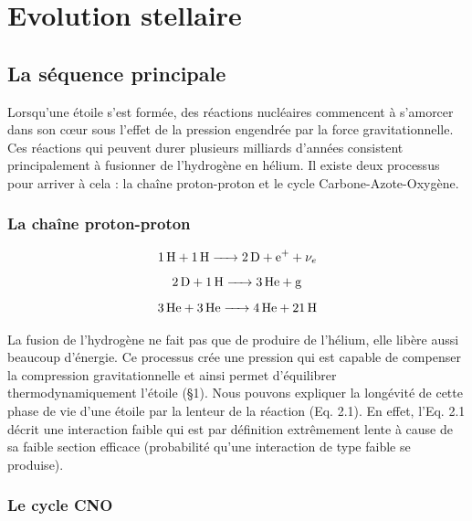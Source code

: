 

	
\chapter{Evolution stellaire}

\section{La séquence principale}

Lorsqu’une étoile s’est formée, des réactions nucléaires commencent à s’amorcer dans son cœur sous l’effet de la pression engendrée par la force gravitationnelle. Ces réactions qui peuvent durer plusieurs milliards d’années consistent principalement à fusionner de l’hydrogène en hélium. Il existe deux processus pour arriver à cela : la chaîne proton-proton et le cycle Carbone-Azote-Oxygène.

\subsection{La chaîne proton-proton}


\begin{equation}\ce{\ce{1H} + \ce{1H} -> \ce{2D} + \ce{e+} + $\nu_{e}$}\end{equation}
\begin{equation}\ce{\ce{2D} + \ce{1H} -> \ce{3He} + g}\end{equation}
\begin{equation}\ce{\ce{3He} + \ce{3He} -> \ce{4He} + \ce{21H}}\end{equation}\smallskip	


La fusion de l’hydrogène ne fait pas que de produire de l’hélium, elle libère aussi beaucoup d’énergie. Ce processus crée une pression qui est capable de compenser la compression gravitationnelle et ainsi permet d’équilibrer thermodynamiquement l’étoile (§1).
Nous pouvons expliquer la longévité de cette phase de vie d’une étoile par la lenteur de la réaction (Eq. 2.1). En effet, l’Eq. 2.1 décrit une interaction faible qui est par définition extrêmement lente à cause de sa faible section efficace (probabilité qu’une interaction de type faible se produise).

\subsection{Le cycle CNO}

